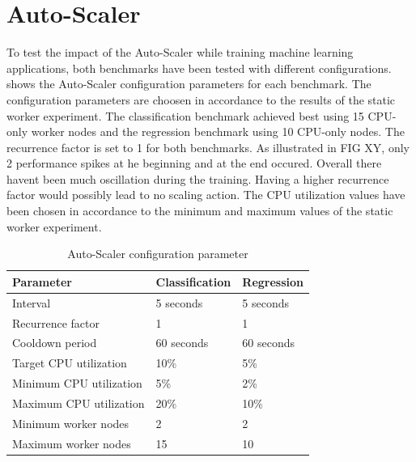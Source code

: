 \section{Auto-Scaler}
To test the impact of the Auto-Scaler while training machine learning applications, both benchmarks have been tested with different configurations.  shows the Auto-Scaler configuration parameters for each benchmark.
The configuration parameters are choosen in accordance to the results of the static worker experiment.
The classification benchmark achieved best using 15 CPU-only worker nodes and the regression benchmark using 10 CPU-only nodes.
The recurrence factor is set to 1 for both benchmarks. As illustrated in FIG XY, only 2 performance spikes at he beginning and at the end occured. Overall there havent been much oscillation during the training. Having a higher recurrence factor would possibly lead to no scaling action.
The CPU utilization values have been chosen in accordance to the minimum and maximum values of the static worker experiment.
\begin{table}[]
\centering
\begin{tabular}{@{}l|ll@{}}
\toprule
Parameter               & Classification & Regression \\ \midrule
Interval                & 5 seconds      & 5 seconds  \\
Recurrence factor       & 1              & 1          \\
Cooldown period         & 60 seconds     & 60 seconds \\
Target CPU utilization  & 10\%           & 5\%        \\
Minimum CPU utilization & 5\%           & 2\%       \\
Maximum CPU utilization & 20\%           & 10\%       \\
Minimum worker nodes    & 2              & 2         \\
Maximum worker nodes    & 15              & 10         \\ \bottomrule
\end{tabular}
\caption{Auto-Scaler configuration parameter}
\label{table:07_auto-scaler_config_parameter}
\end{table}



